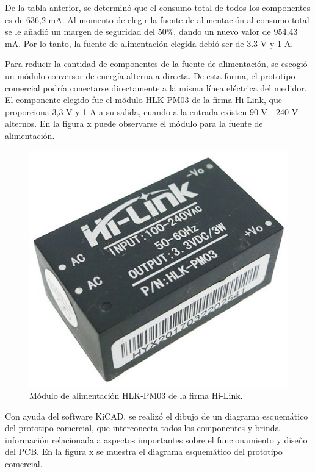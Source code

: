 De la tabla anterior, se determinó que el consumo total de todos los componentes es de 636,2 mA. Al momento de elegir la fuente de alimentación al consumo total se le añadió un margen de seguridad del 50\%, dando un nuevo valor de 954,43 mA. Por lo tanto, la fuente de alimentación elegida debió ser de 3.3 V y 1 A.

Para reducir la cantidad de componentes de la fuente de alimentación, se escogió un módulo conversor de energía alterna a directa. De esta forma, el prototipo comercial podría conectarse directamente a la misma línea eléctrica del medidor. El componente elegido fue el módulo HLK-PM03 de la firma Hi-Link, que proporciona 3,3 V y 1 A a su salida, cuando a la entrada existen 90 V - 240 V alternos. En la figura x puede observarse el módulo para la fuente de alimentación.

\begin{figure}[h]
	\centering
	\includegraphics[scale=0.3]{./Figures/acdc_module.jpg}
	\caption{Módulo de alimentación HLK-PM03 de la firma Hi-Link.}
	\label{fig:blocksTest}
\end{figure}

Con ayuda del software KiCAD, se realizó el dibujo de un diagrama esquemático del prototipo comercial, que interconecta todos los componentes y brinda información relacionada a aspectos importantes sobre el funcionamiento y diseño del PCB. En la figura x se muestra el diagrama esquemático del prototipo comercial.

